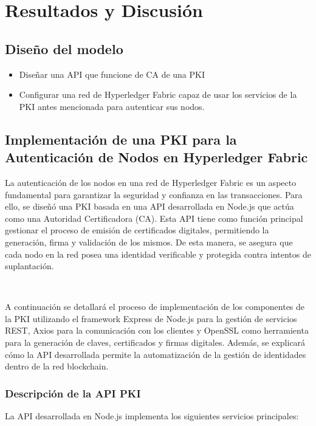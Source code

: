 \chapter{Resultados y Discusión}\label{chapter:implementation}

\section{Diseño del modelo}
\begin{itemize}
    \item Diseñar una API que funcione de CA de una PKI 
    \item Configurar una red de Hyperledger Fabric\cite{hyperledgerfabric} capaz de usar los servicios de la PKI antes mencionada para autenticar sus nodos.
\end{itemize}


\section{Implementación de una PKI para la Autenticación de Nodos en Hyperledger Fabric}
La autenticación de los nodos en una red de Hyperledger Fabric\cite{hyperledgerfabric} es un aspecto fundamental para garantizar la seguridad y confianza en las transacciones. Para ello, se diseñó una PKI basada en una API desarrollada en Node.js\cite{nodejs} que actúa como una Autoridad Certificadora (CA). Esta API tiene como función principal gestionar el proceso de emisión de certificados digitales, permitiendo la generación, firma y validación de los mismos. De esta manera, se asegura que cada nodo en la red posea una identidad verificable y protegida contra intentos de suplantación.

\


A continuación se detallará el proceso de implementación de los componentes de la PKI utilizando el framework Express\cite{express} de Node.js para la gestión de servicios REST, Axios\cite{axios} para la comunicación con los clientes y OpenSSL\cite{openssl} como herramienta para la generación de claves, certificados y firmas digitales. Además, se explicará cómo la API desarrollada permite la automatización de la gestión de identidades dentro de la red blockchain.

\subsection{Descripción de la API PKI}

La API desarrollada en Node.js\cite{nodejs} implementa los siguientes servicios principales:

